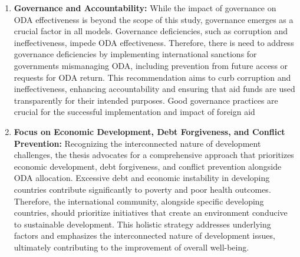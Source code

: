 \begin{enumerate}[i]
    \item \textbf{Governance and Accountability:} While the impact of governance on ODA effectiveness is beyond the scope of this study, governance emerges as a crucial factor in all models. Governance deficiencies, such as corruption and ineffectiveness, impede ODA effectiveness. Therefore, there is need to address governance deficiencies by implementing international sanctions for governments mismanaging ODA, including prevention from future access or requests for ODA return. This recommendation aims to curb corruption and ineffectiveness, enhancing accountability and ensuring that aid funds are used transparently for their intended purposes. Good governance practices are crucial for the successful implementation and impact of foreign aid
    
    \item \textbf{Focus on Economic Development, Debt Forgiveness, and Conflict Prevention:} Recognizing the interconnected nature of development challenges, the thesis advocates for a comprehensive approach that prioritizes economic development, debt forgiveness, and conflict prevention alongside ODA allocation. Excessive debt and economic instability in developing countries contribute significantly to poverty and poor health outcomes. Therefore, the international community, alongside specific developing countries, should prioritize initiatives that create an environment conducive to sustainable development. This holistic strategy addresses underlying factors and emphasizes the interconnected nature of development issues, ultimately contributing to the improvement of overall well-being.
\end{enumerate}


